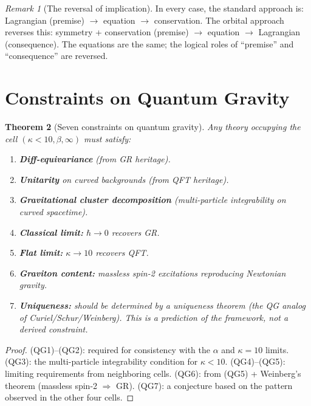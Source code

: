 \documentclass[12pt]{article}
\theoremstyle{plain}
\newtheorem{theorem}{Theorem}[section]
\theoremstyle{definition}
\theoremstyle{remark}
\newtheorem{remark}[theorem]{Remark}
\begin{document}
\begin{remark}[The reversal of implication]\label{rmk:reversal-grand}
In every case, the standard approach is: Lagrangian (premise) $\to$ equation $\to$ conservation. The orbital approach reverses this: symmetry + conservation (premise) $\to$ equation $\to$ Lagrangian (consequence). The equations are the same; the logical roles of ``premise'' and ``consequence'' are reversed.
\end{remark}


\section{Constraints on Quantum Gravity}
\label{sec:qg}

\begin{theorem}[Seven constraints on quantum gravity]\label{thm:qg}
Any theory occupying the cell $(\kappa < 10, \beta, \infty)$ must satisfy:
\begin{enumerate}[label=(QG\arabic*)]
    \item \textbf{Diff-equivariance} (from GR heritage).
    \item \textbf{Unitarity} on curved backgrounds (from QFT heritage).
    \item \textbf{Gravitational cluster decomposition} (multi-particle integrability on curved spacetime).
    \item \textbf{Classical limit:} $\hbar \to 0$ recovers GR.
    \item \textbf{Flat limit:} $\kappa \to 10$ recovers QFT.
    \item \textbf{Graviton content:} massless spin-2 excitations reproducing Newtonian gravity.
    \item \textbf{Uniqueness:} should be determined by a uniqueness theorem (the QG analog of Curiel/Schur/Weinberg). \emph{This is a prediction of the framework, not a derived constraint.}
\end{enumerate}
\end{theorem}

\begin{proof}
(QG1)--(QG2): required for consistency with the $\alpha$ and $\kappa = 10$ limits. (QG3): the multi-particle integrability condition for $\kappa < 10$. (QG4)--(QG5): limiting requirements from neighboring cells. (QG6): from (QG5) + Weinberg's theorem (massless spin-2 $\Rightarrow$ GR). (QG7): a conjecture based on the pattern observed in the other four cells.
\end{proof}
\end{document}
